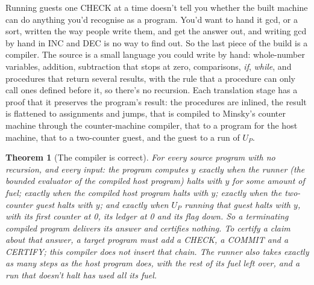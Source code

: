 \documentclass[11pt,twoside]{article}
\theoremstyle{thielethm}
\newtheorem{theorem}{Theorem}[section]
\theoremstyle{thieledef}
\theoremstyle{thieledef}
\theoremstyle{thieledef}
\theoremstyle{thielethm}
\theoremstyle{thieleobs}
\theoremstyle{thielethm}
\begin{document}
Running guests one CHECK at a time doesn't tell you whether the built machine can do anything you'd
recognise as a program. You'd want to hand it gcd, or a sort, written the way people write them, and
get the answer out, and writing gcd by hand in INC and DEC is no way to find out. So the last piece
of the build is a compiler. The source is a small language you could write by hand: whole-number
variables, addition, subtraction that stops at zero, comparisons, \emph{if}, \emph{while}, and
procedures that return several results, with the rule that a procedure can only call ones defined
before it, so there's no recursion. Each translation stage has a proof that it preserves the program's result: the procedures are
inlined, the result is flattened to assignments and jumps, that is compiled to Minsky's counter
machine through the counter-machine compiler, that to a program for the host machine, that to a
two-counter guest, and the guest to a run of $U_P$.

\begin{theorem}[The compiler is correct]
For every source program with no recursion, and every input: the program computes $y$ exactly when
the runner (the bounded evaluator of the compiled host program) halts with $y$ for some amount of fuel; exactly when the compiled host program
halts with $y$; exactly when the two-counter guest halts with $y$; and exactly when $U_P$ running that
guest halts with $y$, with its first counter at 0, its ledger at 0 and its flag down. So a terminating compiled program delivers its answer and certifies nothing. To certify a
claim about that answer, a target program must add a CHECK, a COMMIT and a CERTIFY;
this compiler does not insert that chain. The runner also
takes exactly as many steps as the host program does, with the rest of its fuel left over, and a run
that doesn't halt has used all its fuel.
\end{theorem}
\end{document}
